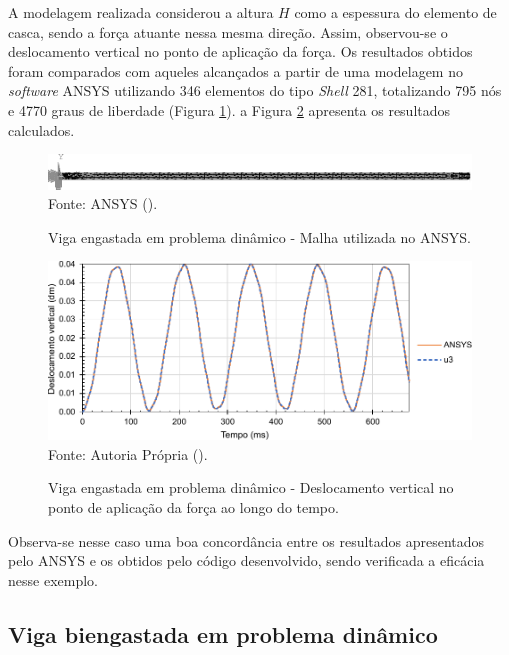 A modelagem realizada considerou a altura $H$ como a espessura do elemento de casca, sendo a força atuante nessa mesma direção. Assim, observou-se o deslocamento vertical no ponto de aplicação da força. Os resultados obtidos foram comparados com aqueles alcançados a partir de uma modelagem no \textit{software} ANSYS utilizando 346 elementos do tipo \textit{Shell} 281, totalizando 795 nós e 4770 graus de liberdade (Figura \ref{fig:beamANSYS1}). a Figura \ref{fig:res-viga1} apresenta os resultados calculados.

\begin{figure}[h!]
    \centering
    \caption{Viga engastada em problema dinâmico - Malha utilizada no ANSYS.}
    \includegraphics[width=\linewidth]{Figuras/vigas/ANSYSmesh1.png}
    \\Fonte: ANSYS (\the\year).
    \label{fig:beamANSYS1}
\end{figure}

\begin{figure}[h!]
    \centering
    \caption{Viga engastada em problema dinâmico - Deslocamento vertical no ponto de aplicação da força ao longo do tempo.}
    \includegraphics[width=.8\linewidth]{Figuras/vigas/res1.pdf}
    \\Fonte: Autoria Própria (\the\year).
    \label{fig:res-viga1}
\end{figure}

Observa-se nesse caso uma boa concordância entre os resultados apresentados pelo ANSYS e os obtidos pelo código desenvolvido, sendo verificada a eficácia nesse exemplo.

\subsection{Viga biengastada em problema dinâmico} \label{Ap:DinBeam2}


